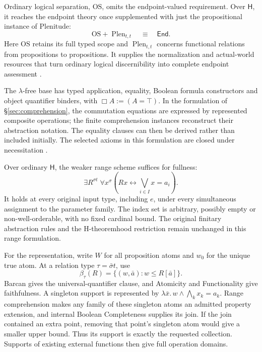 \documentclass[12pt,letterpaper]{article}
\newcommand{\Hlogic}{\mathsf H}
\newcommand{\EndSep}{\mathsf{End}}
\begin{document}
Ordinary logical separation, $\mathrm{OS}$, omits the endpoint-valued requirement. Over $\Hlogic$, it reaches the endpoint theory once supplemented with just the propositional instance of Plenitude:
\[
 \mathrm{OS}+\operatorname{Plen}_{t,t}
 \quad\equiv\quad\EndSep.
\]
Here $\mathrm{OS}$ retains its full typed scope and $\operatorname{Plen}_{t,t}$ concerns functional relations from propositions to propositions. It supplies the normalization and actual-world resources that turn ordinary logical discernibility into complete endpoint assessment \citep[\S\S1--3]{plenbridge}.

The $\lambda$-free base has typed application, equality, Boolean formula constructors and object quantifier binders, with $\Box A:=(A=\top)$. In the formulation of \S\ref{sec:comprehension}, the commutation equations are expressed by represented composite operations; the finite comprehension instances reconstruct their abstraction notation. The equality clauses can then be derived rather than included initially. The selected axioms in this formulation are closed under necessitation \citep{lambdahandoff}.

Over ordinary $\Hlogic$, the weaker range scheme suffices for fullness:
\begin{equation}\label{eq:range}
 \exists R^{\sigma t}\;\forall x^\sigma
 \left(Rx\leftrightarrow\bigvee_{i\in I}x=a_i\right).
\end{equation}
It holds at every original input type, including $e$, under every simultaneous assignment to the parameter family. The index set is arbitrary, possibly empty or non-well-orderable, with no fixed cardinal bound. The original finitary abstraction rules and the H-theoremhood restriction remain unchanged in this range formulation.

For the representation, write $W$ for all proposition atoms and $w_0$ for the unique true atom. At a relation type $\tau=\bar\sigma t$, use
\[
 \beta_\tau(R)=
 \{(w,\bar a):w\le R[\bar a]\}.
\]
Barcan gives the universal-quantifier clause, and Atomicity and Functionality give faithfulness. A singleton support is represented by $\lambda\bar x.\,w\land\bigwedge_k x_k=a_k$. Range comprehension makes any family of these singleton atoms an admitted property extension, and internal Boolean Completeness supplies its join. If the join contained an extra point, removing that point's singleton atom would give a smaller upper bound. Thus its support is exactly the requested collection. Supports of existing external functions then give full operation domains.
\end{document}
